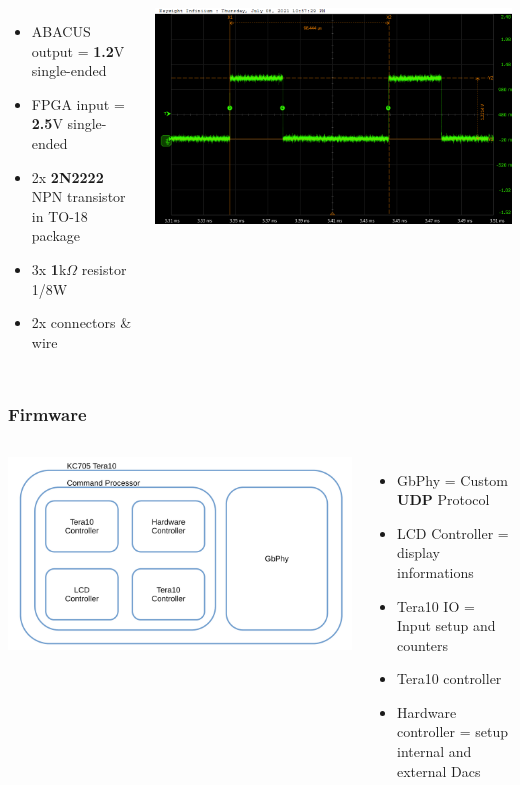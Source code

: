 \documentclass[aspectratio=169]{beamer}
\begin{document}
\begin{frame}
\begin{columns}
\begin{itemize}
			\item ABACUS output = \textbf{1.2}V single-ended
			\item FPGA input = \textbf{2.5}V single-ended
			\item 2x \textbf{2N2222} NPN transistor in TO-18 package
			\item 3x \textbf{1}k$\Omega$ resistor 1/8W
			\item 2x connectors \& wire
		\end{itemize}
		\begin{center}
			\includegraphics[width=0.5 \textwidth]{IMG/probe/09-08-2021_clock-specks.png}
		\end{center}
	\end{columns}
	\end{frame}

	\begin{frame}
		\frametitle{Firmware}
		\begin{columns}
			\begin{center}
				\includegraphics[width=1.0 \textwidth]{IMG/Tera10kc705.pdf}
			\end{center}
			\begin{itemize}
				\item GbPhy = Custom \textbf{UDP} Protocol
				\item LCD Controller = display informations
				\item Tera10 IO = Input setup and counters
				\item Tera10 controller
				\item Hardware controller = setup internal and external Dacs
			\end{itemize}
		\end{columns}
	\end{frame}
\end{document}
